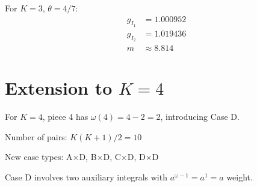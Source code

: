 \documentclass[11pt]{article}
\begin{document}
For $K=3$, $\theta = 4/7$:
\begin{align}
g_{I_1} &= 1.000952 \\
g_{I_2} &= 1.019436 \\
m &\approx 8.814
\end{align}

\section{Extension to $K=4$}

For $K=4$, piece 4 has $\omega(4) = 4 - 2 = 2$, introducing Case D.

Number of pairs: $K(K+1)/2 = 10$

New case types: A$\times$D, B$\times$D, C$\times$D, D$\times$D

Case D involves two auxiliary integrals with $a^{\omega-1} = a^1 = a$ weight.
\end{document}
